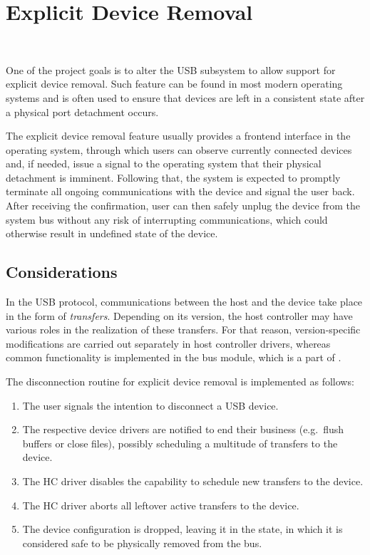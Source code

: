 \section{Explicit Device Removal}~\label{sec:offline}

One of the project goals is to alter the USB subsystem to allow support for
explicit device removal. Such feature can be found in most modern operating
systems and is often used to ensure that devices are left in a consistent state
after a physical port detachment occurs.

The explicit device removal feature usually provides a frontend interface in
the operating system, through which users can observe currently connected
devices and, if needed, issue a signal to the operating system that their
physical detachment is imminent. Following that, the system is expected to
promptly terminate all ongoing communications with the device and signal the
user back. After receiving the confirmation, user can then safely unplug the
device from the system bus without any risk of interrupting communications,
which could otherwise result in undefined state of the device.


\subsection{Considerations}

In the USB protocol, communications between the host and the device take place
in the form of \textit{transfers}. Depending on its version, the host controller
may have various roles in the realization of these transfers. For that reason,
version-specific modifications are carried out separately in host controller
drivers, whereas common functionality is implemented in the bus module, which is
a part of .

The disconnection routine for explicit device removal is implemented as follows:
%
\begin{enumerate}
	\item The user signals the intention to disconnect a USB device.
	\item The respective device drivers are notified to end their business
		(e.g.\ flush buffers or close files), possibly scheduling a multitude of
		transfers to the device.
	\item The HC driver disables the capability to schedule new transfers to the
		device.
	\item The HC driver aborts all leftover active transfers to the device.
	\item The device configuration is dropped, leaving it in the
		 state, in which it is considered safe to be
		physically removed from the bus.
\end{enumerate}


